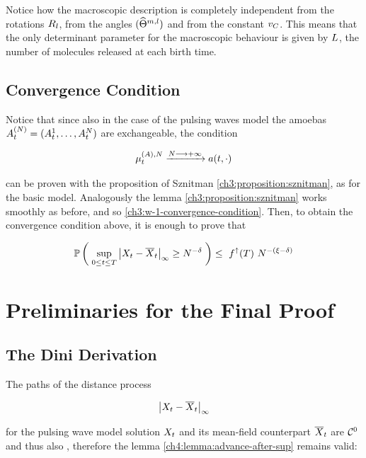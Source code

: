 \begin{remark}\label{ch7:only-important-parameter-is-NumCampRelease}
	Notice how the macroscopic description is completely independent from the rotations $R_l$, from the angles $(\widehat{\Theta}^{m,l})$ and from the constant $v_C$.
	This means that the only determinant parameter for the macroscopic behaviour is given by $L$, the number of molecules released at each birth time.
\end{remark}

\subsection{Convergence Condition}

Notice that since also in the case of the pulsing waves model the amoebas $A_t^{(N)} = (A_t^1, \ldots, A_t^N)$ are exchangeable, the condition 

\begin{equation*}
	\mu_t^{(A),N} \xrightarrow{N\longrightarrow +\infty} a(t,\cdot)
\end{equation*}

can be proven with the proposition of Sznitman \ref{ch3:proposition:sznitman}, as for the basic model.
Analogously the lemma \ref{ch3:proposition:sznitman} works smoothly as before, and so \ref{ch3:w-1-convergence-condition}.
Then, to obtain the convergence condition above, it is enough to prove that

\begin{equation}
	\mathbb{P} \left( \;   
		\sup_{0 \leq t \leq T}
		{ \left| 
			X_t - \overline{X}_t
		 \right|_{\infty} } 
		\geq
		N^{-\delta}
	 \; \right)
	\leq\
	f^\uparrow(T)\
	N^{-(\xi-\delta)}
\end{equation}

\section{Preliminaries for the Final Proof}

\subsection{The Dini Derivation}

The paths of the distance process

\begin{equation*}
	{ \left|  X_t - \overline{X}_t \right|_{\infty} }
\end{equation*}

for the pulsing wave model solution $X_t$ and its mean-field counterpart $\overline{X}_t$ are $\mathcal{C}^0$ and thus also \cadlag, therefore the lemma \ref{ch4:lemma:advance-after-sup} remains valid:

